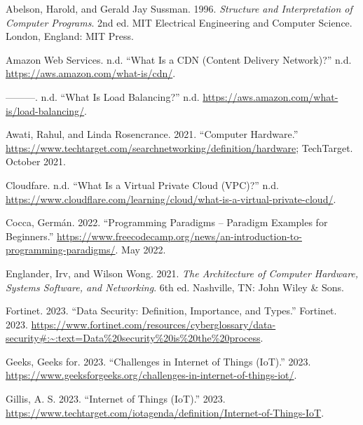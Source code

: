 \documentclass[
  letterpaper,
  DIV=11,
  numbers=noendperiod]{scrreprt}
\newlength{\cslhangindent}
\newenvironment{CSLReferences}[2] %
 {\begin{list}{}{%
  \setlength{\itemindent}{0pt}
  \setlength{\leftmargin}{0pt}
  \setlength{\parsep}{0pt}
  \ifodd #1
   \setlength{\leftmargin}{\cslhangindent}
   \setlength{\itemindent}{-1\cslhangindent}
  \fi
  \setlength{\itemsep}{#2\baselineskip}}}
 {\end{list}}
\begin{document}

\label{refs}
\begin{CSLReferences}{1}{0}
Abelson, Harold, and Gerald Jay Sussman. 1996. \emph{Structure and
Interpretation of Computer Programs}. 2nd ed. MIT Electrical Engineering
and Computer Science. London, England: MIT Press.

Amazon Web Services. n.d. {``What Is a CDN (Content Delivery
Network)?''} n.d. \url{https://aws.amazon.com/what-is/cdn/}.

---------. n.d. {``What Is Load Balancing?''} n.d.
\url{https://aws.amazon.com/what-is/load-balancing/}.

Awati, Rahul, and Linda Rosencrance. 2021. {``Computer Hardware.''}
\url{https://www.techtarget.com/searchnetworking/definition/hardware};
TechTarget. October 2021.

Cloudfare. n.d. {``What Is a Virtual Private Cloud (VPC)?''} n.d.
\url{https://www.cloudflare.com/learning/cloud/what-is-a-virtual-private-cloud/}.

Cocca, Germán. 2022. {``Programming Paradigms -- Paradigm Examples for
Beginners.''}
\url{https://www.freecodecamp.org/news/an-introduction-to-programming-paradigms/}.
May 2022.

Englander, Irv, and Wilson Wong. 2021. \emph{The Architecture of
Computer Hardware, Systems Software, and Networking}. 6th ed. Nashville,
TN: John Wiley \& Sons.

Fortinet. 2023. {``Data Security: Definition, Importance, and Types.''}
Fortinet. 2023.
\url{https://www.fortinet.com/resources/cyberglossary/data-security\#:~:text=Data\%20security\%20is\%20the\%20process}.

Geeks, Geeks for. 2023. {``Challenges in Internet of Things (IoT).''}
2023.
\url{https://www.geeksforgeeks.org/challenges-in-internet-of-things-iot/}.

Gillis, A. S. 2023. {``Internet of Things (IoT).''} 2023.
\url{https://www.techtarget.com/iotagenda/definition/Internet-of-Things-IoT}.


\end{CSLReferences}
\end{document}
